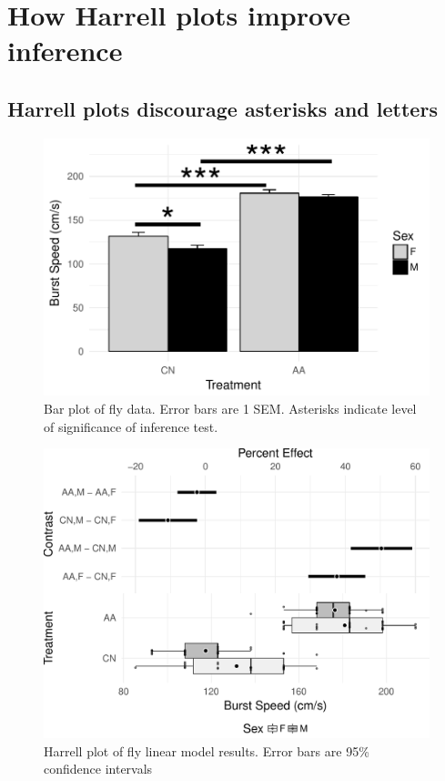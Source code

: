 \documentclass[]{article}
\theoremstyle{definition}
\theoremstyle{definition}
\theoremstyle{definition}
\theoremstyle{remark}
\begin{document}
\section*{How Harrell plots improve
inference}\label{how-harrell-plots-improve-inference}

\subsection*{Harrell plots discourage asterisks and
letters}\label{harrell-plots-discourage-asterisks-and-letters}

\begin{figure}
\includegraphics{../output/flyBar} \caption{Bar plot of fly data. Error bars are 1 SEM. Asterisks indicate level of significance of inference test.}\label{fig:flyBar}
\end{figure}

\begin{figure}
\includegraphics{../output/fly_Hplot} \caption{Harrell plot of fly linear model results. Error bars are 95\% confidence intervals}\label{fig:flyHarrell}
\end{figure}
\end{document}
